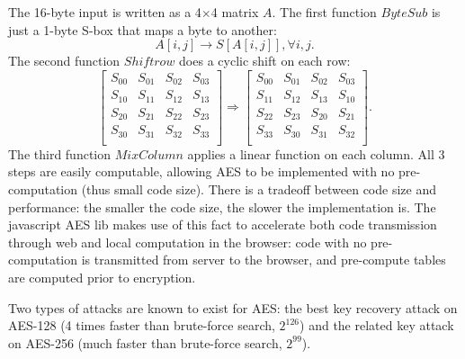 The 16-byte input is written as a 4$\times$4 matrix $A$. The first function $ByteSub$ is just a 1-byte S-box that maps a byte to another:
\[A[i,j]\rightarrow S[A[i,j]],\forall i,j.\]
The second function $Shiftrow$ does a cyclic shift on each row:
\begin{equation*}
\begin{bmatrix}
  S_{00} & S_{01} & S_{02} & S_{03} \\ 
  S_{10} & S_{11} & S_{12} & S_{13} \\ 
  S_{20} & S_{21} & S_{22} & S_{23} \\ 
  S_{30} & S_{31} & S_{32} & S_{33} \\ 
\end{bmatrix}\Rightarrow
\begin{bmatrix}
  S_{00} & S_{01} & S_{02} & S_{03} \\ 
  S_{11} & S_{12} & S_{13} & S_{10} \\ 
  S_{22} & S_{23} & S_{20} & S_{21} \\ 
  S_{33} & S_{30} & S_{31} & S_{32} \\ 
\end{bmatrix}.
\end{equation*}
The third function $MixColumn$ applies a linear function on each column. All 3 steps are easily computable, allowing AES to be implemented with no pre-computation (thus small code size). There is a tradeoff between code size and performance: the smaller the code size, the slower the implementation is. The javascript AES lib makes use of this fact to accelerate both code transmission through web and local computation in the browser: code with no pre-computation is transmitted from server to the browser, and pre-compute tables are computed prior to encryption.

Two types of attacks are known to exist for AES: the best key recovery attack on AES-128 (4 times faster than brute-force search, $2^{126}$) and the related key attack on AES-256 (much faster than brute-force search, $2^{99}$). 
